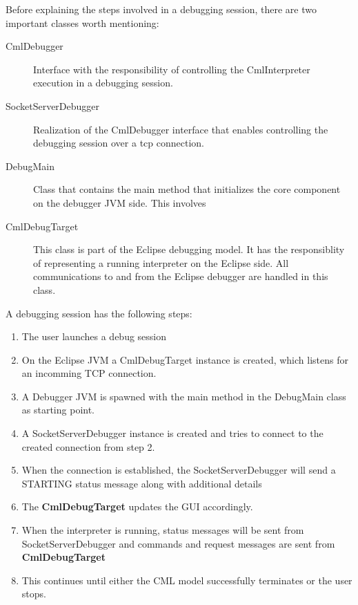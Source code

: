 \documentclass[a4paper, 10pt]{include/compassreport}   %
\begin{document}
Before explaining the steps involved in a debugging session, there are
two important classes worth mentioning:

\begin{description}
\item[CmlDebugger] Interface with the responsibility of
  controlling the CmlInterpreter execution in a debugging session.
\item[SocketServerDebugger] Realization of the CmlDebugger interface
that enables controlling the debugging session over a tcp connection. 
\item[DebugMain] Class that contains the main method that initializes
the core component on the debugger JVM side. This involves
\item[CmlDebugTarget] This class is part of the Eclipse
  debugging model. It has the responsiblity of representing a running
  interpreter on the Eclipse side. All communications to and from
  the Eclipse debugger are handled in this class.
\end{description}

A debugging session has the following steps:
\begin{enumerate}
\item The user launches a debug session
\item On the Eclipse JVM a CmlDebugTarget instance is
  created, which listens for an incomming TCP connection.
\item A Debugger JVM is spawned with the main method in the DebugMain class as starting point.
\item A SocketServerDebugger instance is created and tries to connect to the
  created connection from step 2.
\item When the connection is established, the SocketServerDebugger
  will send a STARTING status message along with additional details
\item The \textbf{CmlDebugTarget} updates the GUI accordingly.
\item When the interpreter is running, status messages will be sent
  from SocketServerDebugger and commands and request messages are sent
  from \textbf{CmlDebugTarget}
\item This continues until either the CML model successfully terminates or the user stops.
\end{enumerate}


\newpage


\label{ch:bib} %
\end{document}

